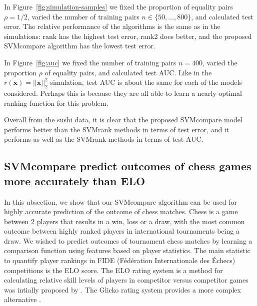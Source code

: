 \documentclass[twoside,11pt]{article}
\newcommand{\changed}[1]{
  #1
}
\begin{document}
In Figure~\ref{fig:simulation-samples} we fixed the proportion of
equality pairs $\rho=1/2$, varied the number of training pairs
$n\in\{50,\dots, 800\}$, and calculated test error. The relative
performance of the algorithms is the same as in the simulations: rank
has the highest test error, rank2 does better, and the proposed
SVMcompare algorithm has the lowest test error.

In Figure~\ref{fig:auc} we fixed the number of training pairs $n=400$,
varied the proportion $\rho$ of equality pairs, and calculated test
AUC. \changed{Like in the $r(\mathbf x)=||\mathbf x||_2^2$ simulation,
  test AUC is about the same for each of the models
  considered. Perhaps this is because they are all able to learn a
  nearly optimal ranking function for this problem.}

\changed{Overall from the sushi data, it is clear that the proposed SVMcompare
model performs better than the SVMrank methods in terms of test error,
and it performs as well as the SVMrank methods in terms of test AUC.
}

\subsection{SVMcompare predict outcomes of chess games more accurately than ELO}

In this ubsection, we show that our SVMcompare algorithm can be used for
highly accurate prediction of the outcome of chess matches. Chess is a
game between 2 players that results in a win, loss or a draw, with the
most common outcome between highly ranked players in international
tournaments being a draw. We wished to predict outcomes of tournament
chess matches by learning a comparison function using features based
on player statistics.  The main statistic to quantify player rankings
in FIDE (Fédération Internationale des Échecs) competitions is the ELO
score.  The ELO rating system is a method for calculating relative
skill levels of players in competitor versus competitor games was
intially proposed by \citet{elo_score}.
The Glicko rating system 
provides a more complex alternative \citep{Glicko}.
\end{document}
